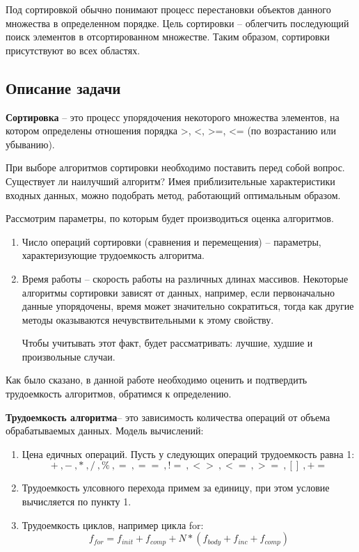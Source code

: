 \documentclass[a4paper,14pt]{article} %
\begin{document}
        Под сортировкой обычно понимают процесс перестановки объектов данного множества в определенном порядке. Цель сортировки -- облегчить последующий поиск элементов в отсортированном множестве. Таким образом, сортировки присутствуют во всех областях. 
        
        \subsection{Описание задачи}
        \hfill
        
        \textbf{Сортировка} -- это процесс упорядочения некоторого множества элементов, на котором определены отношения порядка >, <, >=, <= (по возрастанию или убыванию).
        
        \hfill
        
        При выборе алгоритмов сортировки необходимо поставить перед собой вопрос. Существует ли наилучший алгоритм? Имея приблизительные характеристики входных данных, можно подобрать метод, работающий оптимальным образом.
        
        \hfill
        
        Рассмотрим параметры, по которым будет производиться оценка алгоритмов.
        \begin{enumerate}
	\item Число операций сортировки (сравнения и перемещения) -- параметры, характеризующие трудоемкость алгоритма.
	\item Время работы -- скорость работы на различных длинах массивов. Некоторые алгоритмы сортировки зависят от данных, например, если первоначально данные упорядочены, время может значительно сократиться, тогда как другие методы оказываются нечувствительными к этому свойству. 
	
	Чтобы учитывать этот факт, будет рассматривать: лучшие, худшие и произвольные случаи. 
	\end{enumerate}
	
	Как было сказано, в данной работе необходимо оценить и подтвердить трудоемкость алгоритмов, обратимся к определению. 
        
        \textbf{Трудоемкость алгоритма}-- это зависимость количества операций от объема обрабатываемых данных.
        Модель вычислений:
        \begin{enumerate}
		\item Цена едичных операций. Пусть у следующих операций трудоемкость равна 1:
		$$+~,-~,*~,/~,\%~,=~,==~,!=~,<>~,<=~,>=~,[]~,+=$$
		\item Трудоемкость улсовного перехода примем за единицу, при этом условие вычисляется по пункту 1. 
		\item Трудоемкость циклов, например цикла for:
		$$f_{for} = f_{init}+f_{comp}+N*(f_{body}+f_{inc}+f_{comp})$$
	\end{enumerate}
        
\end{document}
